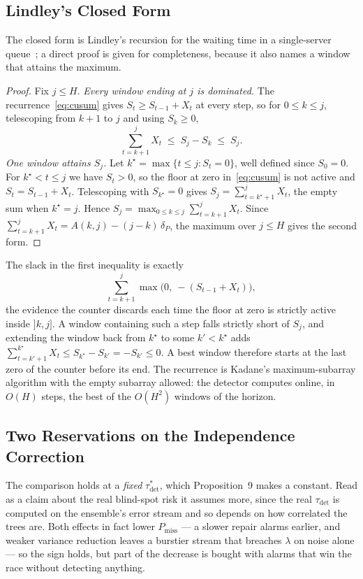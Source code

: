 \documentclass[10pt,conference]{IEEEtran}
\theoremstyle{definition}
\begin{document}
\subsection{Lindley's Closed Form}

The closed form is Lindley's recursion for the waiting time in a single-server
queue~\cite{lindley1952}; a direct proof is given for completeness, because it also names a window that attains the
maximum.

\begin{proof}
Fix $j \le H$. \emph{Every window ending at $j$ is dominated.} The recurrence~\eqref{eq:cusum}
gives $S_t \ge S_{t-1} + X_t$ at every step, so for $0 \le k \le j$, telescoping from $k+1$ to $j$
and using $S_k \ge 0$,
\[
  \sum_{t=k+1}^{j} X_t \;\le\; S_j - S_k \;\le\; S_j .
\]
\emph{One window attains $S_j$.} Let $k^\star = \max\{t \le j : S_t = 0\}$, well defined since
$S_0 = 0$. For $k^\star < t \le j$ we have $S_t > 0$, so the floor at zero
in~\eqref{eq:cusum} is not active and $S_t = S_{t-1} + X_t$. Telescoping with
$S_{k^\star} = 0$ gives $S_j = \sum_{t=k^\star+1}^{j} X_t$, the empty sum when $k^\star = j$.
Hence $S_j = \max_{0 \le k \le j} \sum_{t=k+1}^{j} X_t$. Since
$\sum_{t=k+1}^{j} X_t = A(k,j) - (j-k)\,\delta_P$, the maximum over $j \le H$ gives the
second form.
\end{proof}

\noindent The slack in the first inequality is exactly
\[
  \sum_{t=k+1}^{j} \max\big(0,\ -(S_{t-1} + X_t)\big),
\]
the evidence the counter discards each
time the floor at zero is strictly active inside $]k,j]$. A window containing such a step
falls strictly short of $S_j$, and extending the window back from $k^\star$ to some
$k' < k^\star$ adds $\sum_{t=k'+1}^{k^\star} X_t \le S_{k^\star} - S_{k'} = -S_{k'} \le 0$.
A best window therefore starts at the last zero of the counter before its end. The recurrence
is Kadane's maximum-subarray algorithm with the empty subarray allowed: the detector computes
online, in $O(H)$ steps, the best of the $O(H^2)$ windows of the horizon.


\subsection{Two Reservations on the Independence Correction}

The comparison holds at a \emph{fixed}
$\tau^*_{\mathrm{det}}$, which Proposition~9 makes a constant. Read as a claim about the
real blind-spot risk it assumes more, since the real $\tau_{\mathrm{det}}$ is computed on
the ensemble's error stream and so depends on how correlated the trees are. Both effects
in fact lower $P_{\mathrm{miss}}$ --- a slower repair alarms earlier, and weaker variance
reduction leaves a burstier stream that breaches $\lambda$ on noise alone --- so the sign
holds, but part of the decrease is bought with alarms that win the race without detecting
anything.
\end{document}
